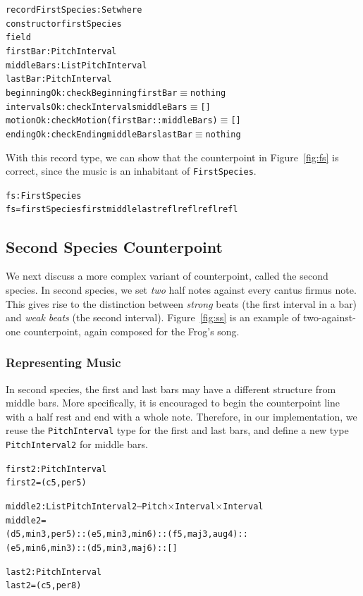 \begin{alltt}
record FirstSpecies : Set where
  constructor firstSpecies
  field
    firstBar    : PitchInterval
    middleBars  : List PitchInterval
    lastBar     : PitchInterval
    beginningOk : checkBeginning firstBar \(\equiv\) nothing
    intervalsOk : checkIntervals middleBars \(\equiv\) []
    motionOk    : checkMotion (firstBar :: middleBars) \(\equiv\) []
    endingOk    : checkEnding middleBars lastBar \(\equiv\) nothing
\end{alltt}

With this record type, we can show that the counterpoint in
Figure~\ref{fig:fs} is correct, since the music is an inhabitant of
\texttt{FirstSpecies}.

\begin{alltt}
fs : FirstSpecies
fs = firstSpecies first middle last refl refl refl refl
\end{alltt}

\subsection{Second Species Counterpoint}
\label{sec:cp:ss}

\SS

We next discuss a more complex variant of counterpoint, called the
second species.
In second species, we set \emph{two} half notes against every cantus
firmus note.
This gives rise to the distinction between \emph{strong} beats (the
first interval in a bar) and \emph{weak beats} (the second interval).
Figure~\ref{fig:ss} is an example of two-against-one counterpoint,
again composed for the Frog's song.

\subsubsection{Representing Music}

In second species, the first and last bars may have a different structure
from middle bars.
More specifically, it is encouraged to begin the counterpoint line with
a half rest and end with a whole note.
Therefore, in our implementation, we reuse the \texttt{PitchInterval} 
type for the first and last bars, and define a new type
\texttt{PitchInterval2} for middle bars.

\begin{alltt}
first2 : PitchInterval
first2 = (c 5 , per5)

middle2 : List PitchInterval2 -- Pitch \(\times\) Interval \(\times\) Interval
middle2 =
  (d 5 , min3 , per5) :: (e 5 , min3 , min6) :: (f 5 , maj3 , aug4) ::
  (e 5 , min6 , min3) :: (d 5 , min3 , maj6) :: []

last2 : PitchInterval
last2 = (c 5 , per8)
\end{alltt}

